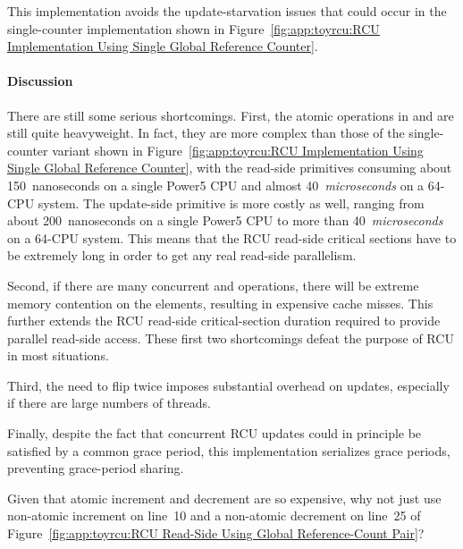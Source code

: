 This implementation avoids the update-starvation issues that could
occur in the single-counter implementation shown in
Figure~\ref{fig:app:toyrcu:RCU Implementation Using Single Global Reference Counter}.

\paragraph{Discussion}

There are still some serious shortcomings.
First, the atomic operations in 
and 
are still quite heavyweight.
In fact, they are more complex than those
of the single-counter variant shown in
Figure~\ref{fig:app:toyrcu:RCU Implementation Using Single Global Reference Counter},
with the read-side primitives consuming about 150~nanoseconds on a single
Power5 CPU and almost 40~\emph{microseconds} on a 64-CPU system.
The update-side  primitive is more costly as
well, ranging from about 200~nanoseconds on a single Power5 CPU to
more than 40~\emph{microseconds} on a 64-CPU system.
This means that the RCU read-side critical sections
have to be extremely long in order to get any real
read-side parallelism.

Second, if there are many concurrent 
and  operations, there will
be extreme memory contention on the 
elements, resulting in expensive cache misses.
This further extends the RCU read-side critical-section
duration required to provide parallel read-side access.
These first two shortcomings defeat the purpose of RCU in most
situations.

Third, the need to flip  twice imposes substantial
overhead on updates, especially if there are large
numbers of threads.

Finally, despite the fact that concurrent RCU updates could in principle be
satisfied by a common grace period, this implementation
serializes grace periods, preventing grace-period
sharing.

\QuickQuiz{}
	Given that atomic increment and decrement are so expensive,
	why not just use non-atomic increment on line~10 and a
	non-atomic decrement on line~25 of
	Figure~\ref{fig:app:toyrcu:RCU Read-Side Using Global Reference-Count Pair}?
 \QuickQuizEnd

